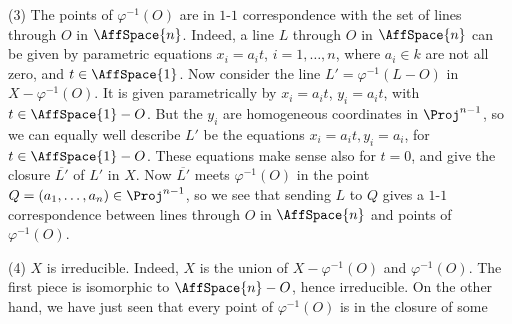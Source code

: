 {(3) The points of $\varphi^{-1}(O)$ are in $1$-$1$ correspondence with the set of lines through $O$ in $\AffSpace{n}$. Indeed, a line $L$ through $O$ in $\AffSpace{n}$ can be given by parametric equations $x_i=a_i t$, $i=1,\ldots,n$, where $a_i\in k$ are not all zero, and $t\in\AffSpace{1}$. Now consider the line $L'=\varphi^{-1}(L-O)$ in $X-\varphi^{-1}(O)$. It is given parametrically by $x_i=a_i t$, $y_i=a_i t$, with $t\in\AffSpace{1}-O$. But the $y_i$ are homogeneous coordinates in $\Proj^{n-1}$, so we can equally well describe $L'$ be the equations $x_i=a_i t,y_i=a_i$, for $t\in\AffSpace{1}-O$. These equations make sense also for $t=0$, and give the closure $\overline{L'}$ of $L'$ in $X$. Now $\overline{L'}$ meets $\varphi^{-1}(O)$ in the point $Q=(a_1,\ldots,a_n)\in\Proj^{n-1}$, so we see that sending $L$ to $Q$ gives a $1$-$1$ correspondence between lines through $O$ in $\AffSpace{n}$ and points of $\varphi^{-1}(O)$.

(4) $X$ is irreducible. Indeed, $X$ is the union of $X-\varphi^{-1}(O)$ and $\varphi^{-1}(O)$. The first piece is isomorphic to $\AffSpace{n}-O$, hence irreducible. On the other hand, we have just seen that every point of $\varphi^{-1}(O)$ is in the closure of some%
}
